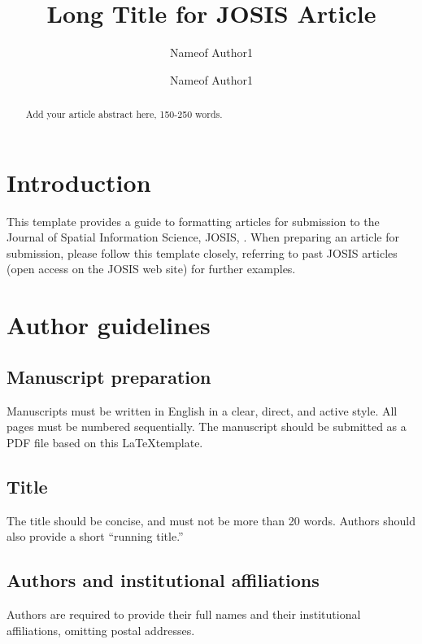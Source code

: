 \documentclass{josis}
\begin{document}


\title{Long Title for JOSIS Article}

\author{Nameof Author1}
\author{Nameof Author1}

\maketitle


\begin{abstract}
Add your article abstract here, 150-250 words. 
\end{abstract}

\section{Introduction}

This template provides a guide to formatting articles for submission to the Journal of Spatial Information Science, JOSIS, . When preparing an article for submission, please follow this template closely, referring to past JOSIS articles (open access on the JOSIS web site) for further examples. 

\section{Author guidelines}

\subsection{Manuscript preparation}
Manuscripts must be written in English in a clear, direct, and active style. All pages must be numbered sequentially. The manuscript should be submitted as a PDF file based on this \LaTeX template. 

\subsection{Title}
The title should be concise, and must not be more than 20 words. Authors should also provide a short ``running title.''

\subsection{Authors and institutional affiliations}
Authors are required to provide their full names and their institutional affiliations, omitting postal addresses.
\end{document}
